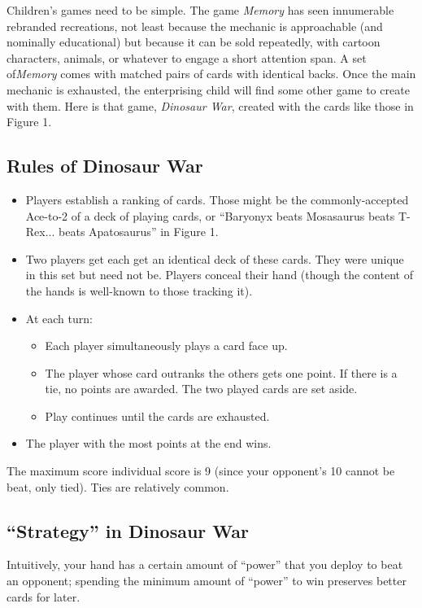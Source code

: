 \documentclass[11pt, oneside]{article} 	%
\begin{document}
Children's games need to be simple. The game \emph{Memory} has seen innumerable rebranded recreations, not least because the mechanic is approachable (and nominally educational) but because it can be sold repeatedly, with cartoon characters, animals, or whatever to engage a short attention span.  A set of\emph{Memory} comes with matched pairs of cards with identical backs.  Once the main mechanic is exhausted, the enterprising child will find some other game to create with them.  Here is that game, \emph{Dinosaur War}, created with the cards like those in Figure 1.

\subsection{Rules of Dinosaur War}

\begin{itemize} 
\item Players establish a ranking of cards.  Those might be the commonly-accepted Ace-to-2 of a deck of playing cards, or ``Baryonyx beats Mosasaurus beats T-Rex... beats Apatosaurus'' in Figure 1.
\item Two players get each get an identical deck of these cards.  They were unique in this set but need not be.  Players conceal their hand (though the content of the hands is well-known to those tracking it).
\item At each turn:
\begin{itemize}
\item Each player simultaneously plays a card face up.
\item The player whose card outranks the others gets one point. If there is a tie, no points are awarded. The two played cards are set aside.
\item Play continues until the cards are exhausted.
\end{itemize}
\item The player with the most points at the end wins.
\end{itemize}

The maximum score individual score is 9 (since your opponent's 10 cannot be beat, only tied).  Ties are relatively common.  

\subsection{``Strategy'' in Dinosaur War}

Intuitively, your hand has a certain amount of ``power'' that you deploy to beat an opponent; spending the minimum amount of ``power'' to win preserves better cards for later.  
\end{document}
